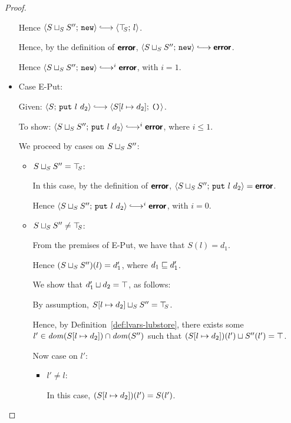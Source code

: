 \begin{proof}
\begin{itemize}
      Hence $\config{\lubstore{S}{S''}}{\NEW} \parstepsto
      \config{\topS}{l}$.

      Hence, by the definition of $\textbf{\textsf{error}}$,
      $\config{\lubstore{S}{S''}}{\NEW} \parstepsto \error$.

      Hence $\config{\lubstore{S}{S''}}{\NEW} \parstepsto^i \error$,
      with $i = 1$.

    \item Case {\sc E-Put}:

      Given: $\config{S}{\putexp{l}{d_2}} \parstepsto
      \config{\extSRaw{S}{l}{d_2}}{\unit}$.

      To show: $\config{\lubstore{S}{S''}}{\putexp{l}{d_2}}
      \parstepsto^i \error$, where $i \leq 1$.

      We proceed by cases on $S \sqcup_{S} S''$:

      \begin{itemize}

        \item $S \sqcup_{S} S'' = \top\hspace{-0.85mm}_{S}$:

          In this case, by the definition of $\textbf{\textsf{error}}$,
          $\langle S \sqcup_{S} S'';\, \mbox{\texttt{put}}~l~d_2 \rangle = \textbf{\textsf{error}}$.

          Hence $\config{\lubstore{S}{S''}}{\putexp{l}{d_2}}
          \parstepsto^i \error$, with $i = 0$.

        \item $S \sqcup_{S} S'' \neq \top\hspace{-0.85mm}_{S}$:

          From the premises of {\sc E-Put}, we have that $S(l) = d_1$.

          Hence $(S \sqcup_{S} S'')(l) = d'_1$, where $d_1 \sqsubseteq
          d'_1$.

          We show that $d'_1 \sqcup d_2 =
          \top$, as follows:

          By assumption, $S[l \mapsto d_2] \sqcup_{S} S'' = \top\hspace{-0.85mm}_{S}$.

          Hence, by Definition~\ref{def:lvars-lubstore}, there exists
          some $l' \in \mathit{dom}(S[l \mapsto d_2]) \cap \mathit{dom}(S'')$ such
          that $(S[l \mapsto d_2])(l') \sqcup S''(l') = \top$.

          Now case on $l'$:

          \begin{itemize}
            \item $l' \neq l$:

              In this case, $(S[l \mapsto d_2])(l') = S(l')$.


\end{itemize}
\end{itemize}
\end{itemize}
\end{proof}
